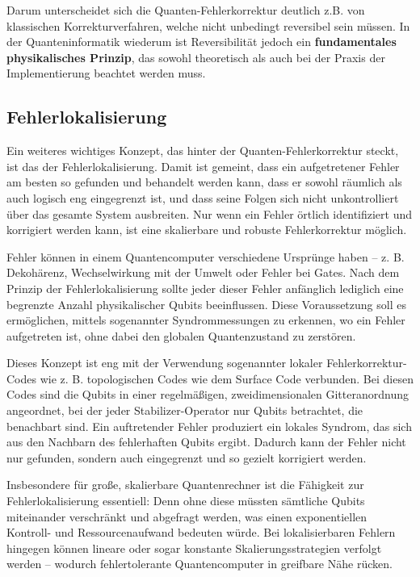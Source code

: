 Darum unterscheidet sich die Quanten-Fehlerkorrektur deutlich z.B. von klassischen Korrekturverfahren, welche nicht unbedingt reversibel sein müssen. In der Quanteninformatik wiederum ist Reversibilität jedoch ein \textbf{fundamentales physikalisches Prinzip}, das sowohl theoretisch als auch bei der Praxis der Implementierung beachtet werden muss.

\subsection{Fehlerlokalisierung}
Ein weiteres wichtiges Konzept, das hinter der Quanten-Fehlerkorrektur steckt, ist das der Fehlerlokalisierung. Damit ist gemeint, dass ein aufgetretener Fehler am besten so gefunden und behandelt werden kann, dass er sowohl räumlich als auch logisch eng eingegrenzt ist, und dass seine Folgen sich nicht unkontrolliert über das gesamte System ausbreiten. Nur wenn ein Fehler örtlich identifiziert und korrigiert werden kann, ist eine skalierbare und robuste Fehlerkorrektur möglich. \cite[Seite 451-452]{nielsen_michael_a_and_isaac_l_chuang_quantum_2010}

Fehler können in einem Quantencomputer verschiedene Ursprünge haben – z. B. Dekohärenz, Wechselwirkung mit der Umwelt oder Fehler bei Gates. Nach dem Prinzip der Fehlerlokalisierung sollte jeder dieser Fehler anfänglich lediglich eine begrenzte Anzahl physikalischer Qubits beeinflussen. Diese Voraussetzung soll es ermöglichen, mittels sogenannter Syndrommessungen zu erkennen, wo ein Fehler aufgetreten ist, ohne dabei den globalen Quantenzustand zu zerstören.

Dieses Konzept ist eng mit der Verwendung sogenannter lokaler Fehlerkorrektur-Codes wie z. B. topologischen Codes wie dem Surface Code verbunden. Bei diesen Codes sind die Qubits in einer regelmäßigen, zweidimensionalen Gitteranordnung angeordnet, bei der jeder Stabilizer-Operator nur Qubits betrachtet, die benachbart sind. Ein auftretender Fehler produziert ein lokales Syndrom, das sich aus den Nachbarn des fehlerhaften Qubits ergibt. Dadurch kann der Fehler nicht nur gefunden, sondern auch eingegrenzt und so gezielt korrigiert werden. \cite{Fowler et al}

Insbesondere für große, skalierbare Quantenrechner ist die Fähigkeit zur Fehlerlokalisierung essentiell: Denn ohne diese müssten sämtliche Qubits miteinander verschränkt und abgefragt werden, was einen exponentiellen Kontroll- und Ressourcenaufwand bedeuten würde. Bei lokalisierbaren Fehlern hingegen können lineare oder sogar konstante Skalierungsstrategien verfolgt werden – wodurch fehlertolerante Quantencomputer in greifbare Nähe rücken.

